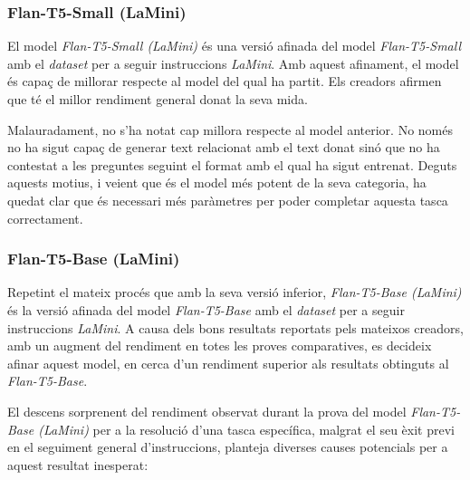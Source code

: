 \subsubsection{Flan-T5-Small (LaMini)}
El model \textit{Flan-T5-Small (LaMini)} \cite{flan-t5} \cite{lamini} és una versió afinada del model \textit{Flan-T5-Small} amb el \textit{dataset} per a seguir instruccions \textit{LaMini}. Amb aquest afinament, el model és capaç de millorar respecte al model del qual ha partit. Els creadors afirmen que té el millor rendiment general donat la seva mida.

Malauradament, no s'ha notat cap millora respecte al model anterior. No només no ha sigut capaç de generar text relacionat amb el text donat sinó que no ha contestat a les preguntes seguint el format amb el qual ha sigut entrenat. Deguts aquests motius, i veient que és el model més potent de la seva categoria, ha quedat clar que és necessari més paràmetres per poder completar aquesta tasca correctament.

\subsubsection{Flan-T5-Base (LaMini)}
Repetint el mateix procés que amb la seva versió inferior, \textit{Flan-T5-Base (LaMini)} \cite{flan-t5} \cite{lamini} és la versió afinada del model \textit{Flan-T5-Base} amb el \textit{dataset} per a seguir instruccions \textit{LaMini}. A causa dels bons resultats reportats pels mateixos creadors, amb un augment del rendiment en totes les proves comparatives, es decideix afinar aquest model, en cerca d'un rendiment superior als resultats obtinguts al \textit{Flan-T5-Base}.

El descens sorprenent del rendiment observat durant la prova del model \textit{Flan-T5-Base (LaMini)} per a la resolució d'una tasca específica, malgrat el seu èxit previ en el seguiment general d'instruccions, planteja diverses causes potencials per a aquest resultat inesperat:

